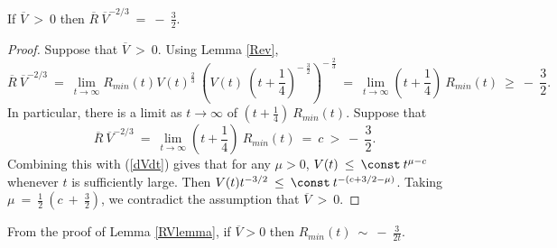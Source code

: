 \begin{lemma}
  \label{lem:kl-noncollapsed-pointed-limits-hyperbolic-noncollapsing-lemma-5}
 \label{RVlemma}
If $\overline{V} \: > \: 0$ then
$\overline{R} \: \overline{V}^{-2/3} \: = \: - \: \frac32$.
\end{lemma}
\begin{proof}
Suppose that $\overline{V} \: > \: 0$.
Using Lemma \ref{Rev},
\begin{equation}
\overline{R} \: \overline{V}^{-2/3}  \: = \:
\lim_{t \rightarrow \infty} R_{min}(t) V(t)^{\frac23} \:
\left( V(t) \: \left(t + \frac14 \right)^{- \: \frac32} \right)^{- \: \frac23} \: = \:
\lim_{t \rightarrow \infty} \left( t + \frac14 \right) \: R_{min}(t) \: \ge \: - \: \frac32.
\end{equation}
In particular, there is a limit as $t \rightarrow \infty$ of
$\left( t + \frac14 \right) \: R_{min}(t)$.
Suppose that
\begin{equation}
\overline{R} \: \overline{V}^{-2/3} \: = \:
\lim_{t \rightarrow \infty} \left( t + \frac14 \right) \: R_{min}(t) \: = \:
c \: >
\: - \: \frac32.
\end{equation}
Combining this with (\ref{dVdt}) gives that for any $\mu > 0$,
$V(t) \: \le \: \const \:
t^{\mu-c}$ whenever $t$ is sufficiently large. Then
$V(t) t^{-3/2} \: \le \: \const \: t^{-(c+3/2 - \mu)}$.
Taking $\mu \: = \: \frac12 \: (c \: + \: \frac32)$, we
contradict the assumption that $\overline{V} \: > \: 0$.
\end{proof}

From the proof of Lemma \ref{RVlemma},
if $\overline{V} > 0$ then $R_{min}(t) \: \sim \: - \: \frac{3}{2t}$.

